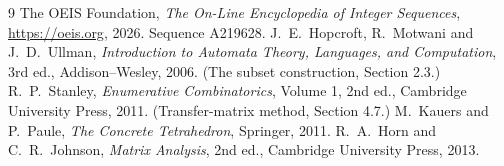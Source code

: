 \documentclass[11pt,a4paper]{article}
\theoremstyle{plain}
\theoremstyle{definition}
\begin{document}
\begin{thebibliography}{9}
 The OEIS Foundation, \emph{The On-Line Encyclopedia of Integer
Sequences}, \url{https://oeis.org}, 2026. Sequence A219628.
 J.~E.~Hopcroft, R.~Motwani and J.~D.~Ullman, \emph{Introduction to Automata
Theory, Languages, and Computation}, 3rd ed., Addison--Wesley, 2006. (The subset
construction, Section 2.3.)
 R.~P.~Stanley, \emph{Enumerative Combinatorics}, Volume 1, 2nd ed.,
Cambridge University Press, 2011. (Transfer-matrix method, Section 4.7.)
 M.~Kauers and P.~Paule, \emph{The Concrete Tetrahedron}, Springer, 2011.
 R.~A.~Horn and C.~R.~Johnson, \emph{Matrix Analysis}, 2nd ed., Cambridge
University Press, 2013.
\end{thebibliography}
\end{document}
